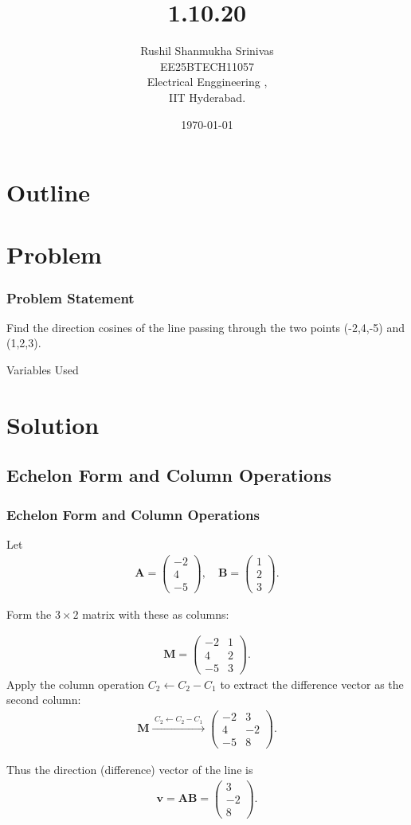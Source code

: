 \documentclass{beamer}
\title{1.10.20}
\author{Rushil Shanmukha Srinivas \\EE25BTECH11057 \\ Electrical Enggineering ,\\IIT Hyderabad.}
\date{\today}
\theoremstyle{remark}
\newcommand{\myvec}[1]{\ensuremath{\begin{pmatrix}#1\end{pmatrix}}}
\let\vec\mathbf
\numberwithin{equation}{section}
\begin{document}
 

\begin{frame}
\titlepage
\end{frame}

\section*{Outline}
\begin{frame}
\tableofcontents
\end{frame}
\section{Problem}
\begin{frame}
\frametitle{Problem Statement}

Find the direction cosines of the line passing through the two points (-2,4,-5) and (1,2,3).
\\ \begin{table}[h!]    
  \centering
  
  \caption{Variables Used}
\end{table}
\end{frame}
\section{Solution}
\subsection{Echelon Form and Column Operations}
\begin{frame}
\frametitle{Echelon Form and Column Operations}
Let
\begin{align}
\vec{A}=\myvec {-2 \\ 4 \\ -5} ,\quad
\vec{B}=\myvec {1 \\ 2 \\ 3} .
\end{align}

Form the $3\times2$ matrix with these as columns:

\begin{align}
\vec{M}=\myvec {-2 & 1 \\ 4 & 2 \\ -5 & 3} .
\end{align}
Apply the column operation $C_2\leftarrow C_2-C_1$ to extract the difference vector as the second column:
\begin{align}
\vec{M} \xrightarrow{\;C_2\leftarrow C_2-C_1\;}
\myvec {-2 & 3 \\ 4 & -2 \\ -5 & 8} .
\end{align}
\end{frame}
\begin{frame}
Thus the direction (difference) vector of the line is
\begin{align}
\vec{v}=\vec{AB}=\myvec {3 \\ -2 \\ 8} .
\end{align}

\end{frame}
\end{document}
